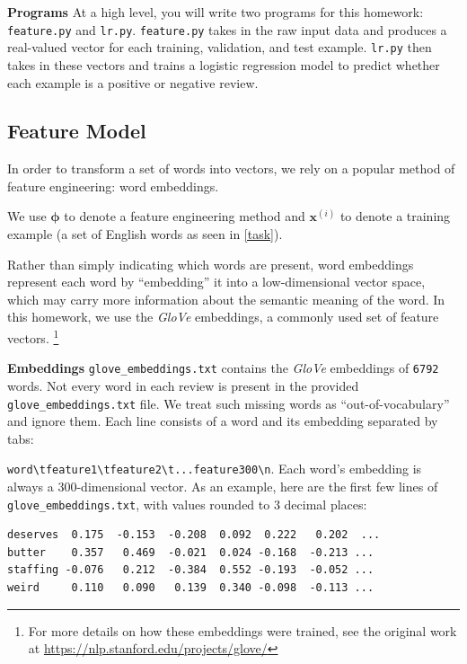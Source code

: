 \documentclass[11pt,addpoints,answers]{exam}
\newcommand{\xv}{\mathbf{x}}
\begin{document}
{\bf Programs } 
At a high level, you will write two programs for this homework: \texttt{feature.py} and \texttt{lr.py}. \texttt{feature.py} takes in the raw input data and produces a real-valued vector for each training, validation, and test example. \texttt{lr.py} then takes in these vectors and trains a logistic regression model to predict whether each example is a positive or negative review.


\subsection{Feature Model}\label{featuremodels}
In order to transform a set of words into vectors, we rely on a popular method of feature engineering: word embeddings.

We use $\boldsymbol{\phi}$ to denote a feature engineering method and $\xv^{(i)}$ to denote a training example (a set of English words as seen in \ref{task}).

Rather than simply indicating which words are present, word embeddings represent each word by ``embedding'' it into a low-dimensional vector space, which may carry more information about the semantic meaning of the word. In this homework, we use the \emph{GloVe} embeddings, a commonly used set of feature vectors. \footnote{For more details on how these embeddings were trained, see the original work at   \url{https://nlp.stanford.edu/projects/glove/}}

{\bf Embeddings }
\texttt{glove\_embeddings.txt} contains the \emph{GloVe} embeddings of \texttt{6792} words. 
Not every word in each review is present in the provided \texttt{glove\_embeddings.txt} file. We treat such missing words as ``out-of-vocabulary'' and ignore them. Each line consists of a word and its embedding separated by tabs:

\lstinline{word\tfeature1\tfeature2\t...feature300\n}. Each word's embedding is always a 300-dimensional vector. As an example, here are the first few lines of \texttt{glove\_embeddings.txt}, with values rounded to 3 decimal places:
\begin{lstlisting}
deserves  0.175  -0.153  -0.208  0.092  0.222   0.202  ...
butter    0.357   0.469  -0.021  0.024 -0.168  -0.213 ...
staffing -0.076   0.212  -0.384  0.552 -0.193  -0.052 ...
weird     0.110   0.090   0.139  0.340 -0.098  -0.113 ...     
\end{lstlisting}
\end{document}
